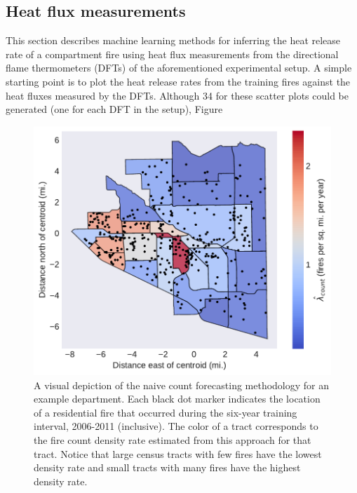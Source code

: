 \documentclass{article}
\begin{document}
\subsection{Heat flux measurements}
This section describes machine learning methods for inferring the heat release rate of a compartment fire using heat flux measurements from the directional flame thermometers (DFTs) of the aforementioned experimental setup. A simple starting point is to plot the heat release rates from the training fires against the heat fluxes measured by the DFTs. Although 34 for these scatter plots could be generated (one for each DFT in the setup), Figure 






\begin{figure}[htbp] \centering
\includegraphics[width=.75\textwidth]{./figures/spatial_histogram.pdf}
\caption{A visual depiction of the naive count forecasting methodology for an example department. Each black dot marker indicates the location of a residential fire that occurred during the six-year training interval, 2006-2011 (inclusive). The color of a tract corresponds to the fire count density rate estimated from this approach for that tract. Notice that large census tracts with few fires have the lowest density rate and small tracts with many fires have the highest density rate.}
\label{fig:spatial_histogram}
\end{figure}








\clearpage


\end{document}
